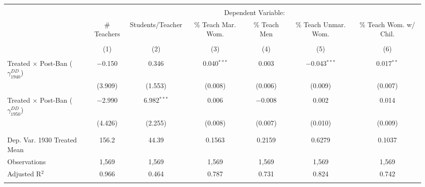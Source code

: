 
\begin{tabular}{@{\extracolsep{5pt}}lcccccc} 
\\[-1.8ex]\hline 
\hline \\[-1.8ex] 
 & \multicolumn{6}{c}{Dependent Variable:} \\ 
\cline{2-7} 
 & \# Teachers & Students/Teacher & \% Teach Mar. Wom. & \% Teach Men & \% Teach Unmar. Wom. & \% Teach Wom. w/ Chil. \\ 
\\[-1.8ex] & (1) & (2) & (3) & (4) & (5) & (6)\\ 
\hline \\[-1.8ex] 
 Treated $\times$ Post-Ban ($\gamma_{1940}^{DD}$) & $-$0.150 & 0.346 & 0.040$^{***}$ & 0.003 & $-$0.043$^{***}$ & 0.017$^{**}$ \\ 
  & (3.909) & (1.553) & (0.008) & (0.006) & (0.009) & (0.007) \\ 
  & & & & & & \\ 
 Treated $\times$ Post-Ban ($\gamma_{1950}^{DD}$) & $-$2.990 & 6.982$^{***}$ & 0.006 & $-$0.008 & 0.002 & 0.014 \\ 
  & (4.426) & (2.255) & (0.008) & (0.007) & (0.010) & (0.009) \\ 
  & & & & & & \\ 
\hline \\[-1.8ex] 
Dep. Var. 1930 Treated Mean & 156.2 & 44.39 & 0.1563 & 0.2159 & 0.6279 & 0.1037 \\ 
Observations & 1,569 & 1,569 & 1,569 & 1,569 & 1,569 & 1,569 \\ 
Adjusted R$^{2}$ & 0.966 & 0.464 & 0.787 & 0.731 & 0.824 & 0.742 \\ 
\hline 
\hline \\[-1.8ex] 
\end{tabular} 

